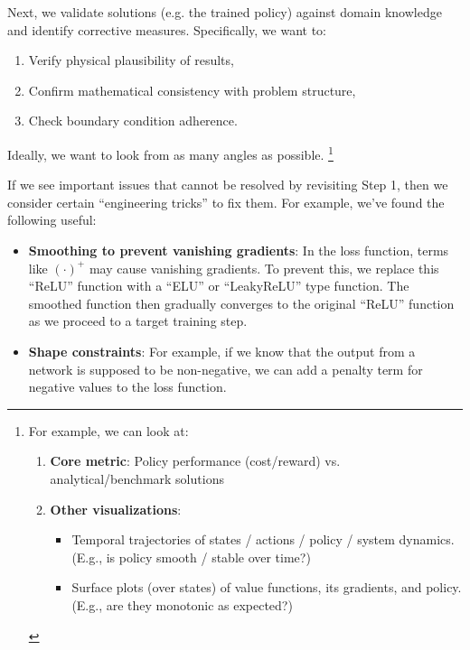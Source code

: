 \documentclass{tufte-handout}
\begin{document}
Next, we validate solutions (e.g. the trained policy) against domain knowledge and identify corrective measures. 
Specifically, we want to: 
\begin{enumerate}
    \item Verify physical plausibility of results, 
    \item Confirm mathematical consistency with problem structure, 
    \item Check boundary condition adherence. 
\end{enumerate}
Ideally, we want to look from as many angles as possible. 
\footnote{
    For example, we can look at: 
    \begin{enumerate}
        \item \textbf{Core metric}: Policy performance (cost/reward) vs. analytical/benchmark solutions
        \item \textbf{Other visualizations}:
            \begin{itemize}
                \item Temporal trajectories of states / actions / policy / system dynamics. (E.g., is policy smooth / stable over time?)
                \item Surface plots (over states) of value functions, its gradients, and policy. (E.g., are they monotonic as expected?)
            \end{itemize}
    \end{enumerate}
}

If we see important issues that cannot be resolved by revisiting Step 1, then we consider certain ``engineering tricks'' to fix them.
For example, we've found the following useful: 
\begin{itemize}
    \item \textbf{Smoothing to prevent vanishing gradients}: 
    In the loss function, terms like $(\cdot)^+$ may cause vanishing gradients. 
    To prevent this, we replace this ``ReLU'' function with a ``ELU'' or ``LeakyReLU'' type function. 
    The smoothed function then gradually converges to the original ``ReLU'' function as we proceed to a target training step.
    \item \textbf{Shape constraints}: 
    For example, if we know that the output from a network is supposed to be non-negative, we can add a penalty term for negative values to the loss function.
\end{itemize}


\end{document}
